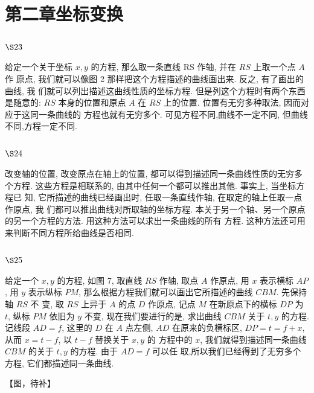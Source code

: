 \chapter{第二章坐标变换}

\section{$\S 23$}

给定一个关于坐标 $x, y$ 的方程, 那么取一条直线 RS 作轴, 并在 $R S$ 上取一个点 $A$ 作 原点, 我们就可以像图 2 那样把这个方程描述的曲线画出来. 反之, 有了画出的曲线, 我 们就可以列出描述这曲线性质的坐标方程. 但是列这个方程时有两个东西是随意的: $R S$ 本身的位置和原点 $A$ 在 $R S$ 上的位置. 位置有无穷多种取法, 因而对应于这同一条曲线的 方程也就有无穷多个. 可见方程不同,曲线不一定不同, 但曲线不同,方程一定不同.

\section{$\S 24$}

改变轴的位置, 改变原点在轴上的位置, 都可以得到描述同一条曲线性质的无穷多 个方程. 这些方程是相联系的, 由其中任何一个都可以推出其他. 事实上, 当坐标方程已 知, 它所描述的曲线已经画出时, 任取一条直线作轴, 在取定的轴上任取一点作原点, 我 们都可以推出曲线对所取轴的坐标方程. 本 关于另一个轴、另一个原点的另一个方程的方法. 用这种方法可以求出一条曲线的所有 方程. 这种方法还可用来判断不同方程所给曲线是否相同.

\section{$\S 25$}

给定一个 $x, y$ 的方程, 如图 7, 取直线 $R S$ 作轴, 取点 $A$ 作原点, 用 $x$ 表示横标 $A P$, 用 $y$ 表示纵标 $P M$, 那么根据方程我们就可以画出它所描述的曲线 $C B M$. 先保持轴 $R S$ 不 变, 取 $R S$ 上异于 $A$ 的点 $D$ 作原点, 记点 $M$ 在新原点下的横标 $D P$ 为 $t$, 纵标 $P M$ 依旧为 $y$ 不变, 现在我们要进行的是, 求出曲线 $C B M$ 关于 $t, y$ 的方程. 记线段 $A D=f$, 这里的 $D$ 在 $A$ 点左侧, $A D$ 在原来的负横标区, $D P=t=f+x$, 从而 $x=t-f$, 以 $t-f$ 替换关于 $x, y$ 的 方程中的 $x$, 我们就得到描述同一条曲线 $C B M$ 的关于 $t, y$ 的方程. 由于 $A D=f$ 可以任 取,所以我们已经得到了无穷多个方程, 它们都描述同一条曲线. 


【图，待补】

